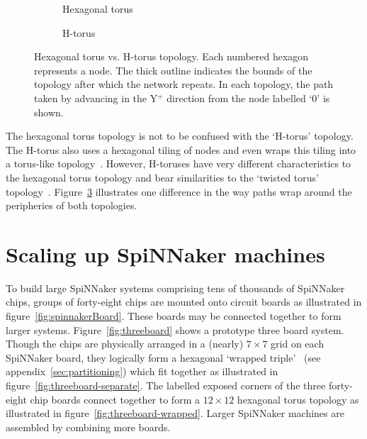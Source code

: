 		\begin{figure}
			\center
			\begin{subfigure}[b]{0.45\linewidth}
				\center
				\caption{Hexagonal torus}
				\label{fig:topo-compare-hexagonal-torus}
			\end{subfigure}
			\begin{subfigure}[b]{0.45\linewidth}
				\center
				\caption{H-torus}
				\label{fig:topo-compare-h-torus}
			\end{subfigure}
			
			\caption[Hexagonal torus vs. H-torus topology.]%
			{Hexagonal torus vs. H-torus topology. Each numbered hexagon
			represents a node. The thick outline indicates the bounds of the
			topology after which the network repeats. In each topology, the path
			taken by advancing in the Y$^+$ direction from the node labelled `0' is
			shown.}
			\label{fig:topo-compare}
		\end{figure}
		
		\label{sec:hex-vs-h-torus}
		
		The hexagonal torus topology is not to be confused with the `H-torus'
		topology. The H-torus also uses a hexagonal tiling of nodes and even wraps
		this tiling into a torus-like topology~\cite{zhao08}. However, H-toruses
		have very different characteristics to the hexagonal torus topology and
		bear similarities to the `twisted torus' topology~\cite{camara10}.
		Figure~\ref{fig:topo-compare} illustrates one difference in the way paths
		wrap around the peripheries of both topologies.
	
	\section{Scaling up SpiNNaker machines}
		
		To build large SpiNNaker systems comprising tens of thousands of SpiNNaker
		chips, groups of forty-eight chips are mounted onto circuit boards as
		illustrated in figure~\ref{fig:spinnakerBoard}. These boards may be
		connected together to form larger systems.  Figure~\ref{fig:threeboard}
		shows a prototype three board system. Though the chips are physically
		arranged in a (nearly) $7\times7$ grid on each SpiNNaker board, they
		logically form a hexagonal `wrapped triple'~\cite{davidsonWiring} (see
		appendix~\ref{sec:partitioning}) which fit together as illustrated in
		figure~\ref{fig:threeboard-separate}. The labelled exposed corners of the
		three forty-eight chip boards connect together to form a $12\times12$
		hexagonal torus topology as illustrated in
		figure~\ref{fig:threeboard-wrapped}. Larger SpiNNaker machines are
		assembled by combining more boards.
		
